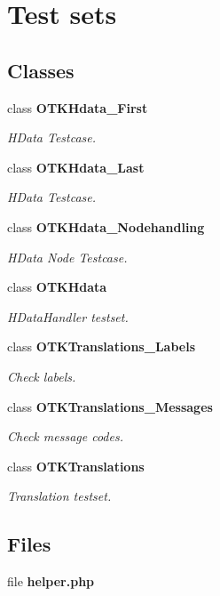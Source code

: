 \section{Test sets}
\label{group__OTK__TESTSETS}
\subsection*{Classes}
\begin{DoxyCompactItemize}
\item 
class {\bf OTKHdata\_\-First}
\begin{DoxyCompactList}\small\item\em HData Testcase. \end{DoxyCompactList}\item 
class {\bf OTKHdata\_\-Last}
\begin{DoxyCompactList}\small\item\em HData Testcase. \end{DoxyCompactList}\item 
class {\bf OTKHdata\_\-Nodehandling}
\begin{DoxyCompactList}\small\item\em HData Node Testcase. \end{DoxyCompactList}\item 
class {\bf OTKHdata}
\begin{DoxyCompactList}\small\item\em HDataHandler testset. \end{DoxyCompactList}\item 
class {\bf OTKTranslations\_\-Labels}
\begin{DoxyCompactList}\small\item\em Check labels. \end{DoxyCompactList}\item 
class {\bf OTKTranslations\_\-Messages}
\begin{DoxyCompactList}\small\item\em Check message codes. \end{DoxyCompactList}\item 
class {\bf OTKTranslations}
\begin{DoxyCompactList}\small\item\em Translation testset. \end{DoxyCompactList}\end{DoxyCompactItemize}
\subsection*{Files}
\begin{DoxyCompactItemize}
\item 
file {\bf helper.php}
\end{DoxyCompactItemize}
